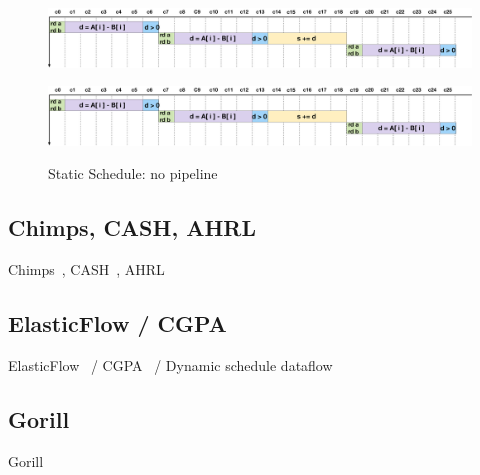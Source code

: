 \begin{figure}[!h]
    \begin{minipage}[t]{\linewidth}
        \centering
        \includegraphics[width=1\textwidth]{figures/Introduction/schedule.pdf}
        \label{fig:no_pipeline}
    \end{minipage}
    \hspace{0.1cm}
    \begin{minipage}[t]{\linewidth} 
        \centering
        \includegraphics[width=1\textwidth]{figures/Introduction/schedule.pdf}
        \label{fig:pipeline}
    \end{minipage}        
    \label{fig:schedule}
    \caption{Static Schedule: no pipeline}
\end{figure}  





\subsection{Chimps, CASH, AHRL}

Chimps~\cite{chimps}, CASH~\cite{budiu_pegasus_2002,budiu_cash_2002}, AHRL~\cite{ahrl}
%

\subsection{ElasticFlow / CGPA}

ElasticFlow~\cite{elasticFlow} / CGPA~\cite{cgpa} / Dynamic schedule dataflow~\cite{josipovic_fpga_2018_dynamically}
%

\subsection{Gorill}
Gorill~\cite{lavasani_thesis}

